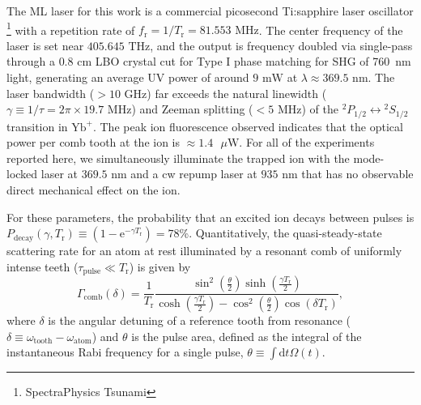 \documentclass[preprint,superscriptaddress,amsmath,amssymb,aps,prl]{revtex4-1}
\begin{document}
The ML laser for this work is a commercial picosecond Ti:sapphire laser oscillator \footnote{SpectraPhysics Tsunami} with a repetition rate of $f_\mathrm{r} = 1/T_\mathrm{r} = 81.553\mbox{ MHz}$.  The center frequency of the laser is set near $405.645\mbox{ THz}$, and the output is frequency doubled via single-pass through  a $0.8\mbox{ cm}$ LBO crystal cut for Type I phase matching for SHG of 760\mbox{ nm} light, generating an average UV power of around $9\mbox{ mW}$ at $\lambda \approx 369.5\mbox{ nm}$.  The laser bandwidth ($> 10 \mbox{ GHz}$) far exceeds the natural linewidth ($\gamma \equiv 1/\tau = 2 \pi \times 19.7\mbox{ MHz}$) and Zeeman splitting ($< 5 \mbox{ MHz}$) of the ${}^2P_{1/2} \leftrightarrow {}^2S_{1/2}$ transition in $\mathrm{Yb}^+$.  The peak ion fluorescence observed indicates that the optical power per comb tooth at the ion is $\approx 1.4 \mbox{ }\mu\mbox{W}$.  For all of the experiments reported here, we simultaneously illuminate the trapped ion with the mode-locked laser at $369.5\mbox{ nm}$ and a cw repump laser at $935\mbox{ nm}$ that has no observable direct mechanical effect on the ion.

For these parameters, the probability that an excited ion decays between pulses is $P_\mathrm{decay}(\gamma, T_\mathrm{r}) \equiv (1 - \mathrm{e}^{-\gamma T_\mathrm{r}}) = 78$\%. Quantitatively, the quasi-steady-state scattering rate for an atom at rest illuminated by a resonant comb of uniformly intense teeth ($\tau_\mathrm{pulse} \ll T_\mathrm{r}$) is given by \cite{Felinto2003coherent,Ilinova2011doppler,Aumiler2012simultaneous}
\begin{equation}
\Gamma_\mathrm{comb}(\delta) = \frac{1}{T_\mathrm{r}}\frac{\sin^2\left( \frac{\theta}{2} \right) \sinh \left( \frac{\gamma T_\mathrm{r}}{2}\right)}{\cosh \left( \frac{\gamma T_\mathrm{r}}{2}\right)- \cos^2\left( \frac{\theta}{2} \right)\cos (\delta T_\mathrm{r})},\label{eqn:barecomb}
\end{equation}
where $\delta$ is the angular detuning of a reference tooth from resonance ($\delta \equiv \omega_\mathrm{tooth} - \omega_\mathrm{atom}$) and $\theta$ is the pulse area, defined as the integral of the instantaneous Rabi frequency for a single pulse, $\theta \equiv \int\mathrm{d}t \Omega(t)$.
\end{document}
